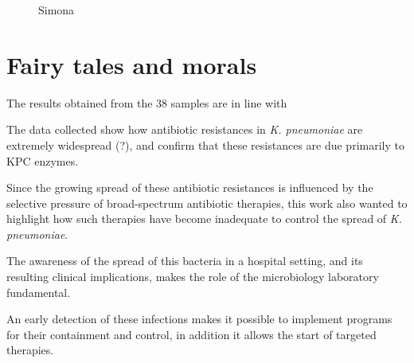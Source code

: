 \documentclass[11pt]{report}
\begin{document}
\begin{figure}[h!]
\centering

\caption{Simona}
\end{figure}

\chapter{Fairy tales and morals}



The results obtained from the 38 samples are in line with 

The data collected show how antibiotic resistances in \emph{K. pneumoniae} are extremely widespread (?), and confirm that these resistances are due primarily to KPC enzymes.

Since the growing spread of these antibiotic resistances is influenced by the selective pressure of broad-spectrum antibiotic therapies, this work also wanted to highlight how such therapies have become inadequate to control the spread of \emph{K. pneumoniae}.

The awareness of the spread of this bacteria in a hospital setting, and its resulting clinical implications, makes the role of the microbiology laboratory fundamental. 

An early detection of these infections makes it possible to implement programs for their containment and control, in addition it allows the start of targeted therapies.
































\end{document}
